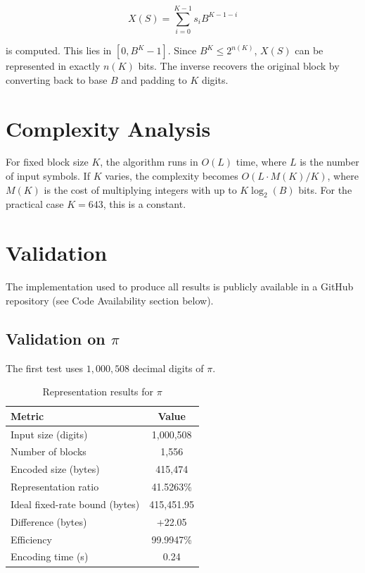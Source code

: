 \documentclass[10pt, conference]{IEEEtran}
\begin{document}
\[
X(S) = \sum_{i=0}^{K-1} s_i B^{K-1-i}
\]

is computed. This lies in $[0, B^K - 1]$. Since $B^K \le 2^{n(K)}$, $X(S)$ can be represented in exactly $n(K)$ bits. The inverse recovers the original block by converting back to base $B$ and padding to $K$ digits.

\section{Complexity Analysis}

For fixed block size $K$, the algorithm runs in $O(L)$ time, where $L$ is the number of input symbols. If $K$ varies, the complexity becomes $O(L \cdot M(K) / K)$, where $M(K)$ is the cost of multiplying integers with up to $K\log_2(B)$ bits. For the practical case $K=643$, this is a constant.

\section{Validation}

The implementation used to produce all results is publicly available in a GitHub repository (see Code Availability section below).

\subsection{Validation on $\pi$}

The first test uses $1,000,508$ decimal digits of $\pi$.

\begin{table}[ht]
\centering
\caption{Representation results for $\pi$}
\label{tab:pi}
\begin{tabular}{lc}
\toprule
Metric & Value \\
\midrule
Input size (digits) & 1,000,508 \\
Number of blocks & 1,556 \\
Encoded size (bytes) & 415,474 \\
Representation ratio & 41.5263\% \\
Ideal fixed-rate bound (bytes) & 415,451.95 \\
Difference (bytes) & +22.05 \\
Efficiency & 99.9947\% \\
Encoding time (s) & 0.24 \\
\bottomrule
\end{tabular}
\end{table}
\end{document}
